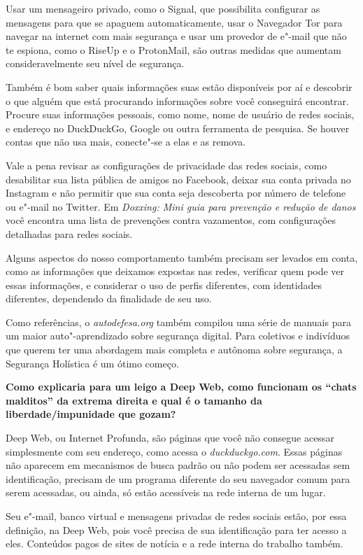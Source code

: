 Usar um mensageiro privado, como o
Signal, que possibilita configurar as
mensagens para que se apaguem automaticamente, usar o
Navegador Tor para navegar na
internet com mais segurança e usar um provedor de e"-mail que não te
espiona, como o RiseUp e o
ProtonMail, são outras
medidas que aumentam consideravelmente seu nível de segurança.

Também é bom saber quais informações suas estão disponíveis por aí e
descobrir o que alguém que está procurando informações sobre você
conseguirá encontrar. Procure suas informações pessoais, como nome, nome
de usuário de redes sociais,  e endereço no DuckDuckGo, Google ou
outra ferramenta de pesquisa. Se houver contas que não usa mais,
conecte"-se a elas e as remova.

Vale a pena revisar as configurações de privacidade das redes sociais,
como desabilitar sua lista pública de amigos no Facebook, deixar sua
conta privada no Instagram e não permitir que sua conta seja descoberta
por número de telefone ou e"-mail no Twitter. Em
\emph{Doxxing:
Mini guia para prevenção e redução de danos} você encontra uma
lista de prevenções contra vazamentos, com configurações detalhadas para
redes sociais.

Alguns aspectos do nosso comportamento também precisam ser levados em
conta, como as informações que deixamos expostas nas redes, verificar quem
pode ver essas informações, e considerar o uso de perfis diferentes, com
identidades diferentes, dependendo da finalidade de seu uso.

Como referências, o \emph{autodefesa.org} também compilou uma série de manuais para um maior auto"-aprendizado
sobre segurança digital. Para coletivos e indivíduos que querem ter uma
abordagem mais completa e autônoma sobre segurança, a
Segurança Holística é um ótimo começo.

\bigskip

\noindent{}\textbf{Como explicaria para um leigo a Deep Web, como funcionam os
``chats malditos'' da extrema direita e qual é o tamanho da
liberdade/impunidade que gozam?}

Deep Web, ou Internet Profunda, são páginas que
você não consegue acessar simplesmente com seu endereço, como acessa o
\emph{duckduckgo.com}. Essas páginas não aparecem em mecanismos de busca padrão
ou não podem ser acessadas sem identificação, precisam de um programa
diferente do seu navegador comum para serem acessadas, ou ainda, só
estão acessíveis na rede interna de um lugar.

Seu e"-mail, banco virtual e mensagens privadas de redes sociais estão,
por essa definição, na Deep Web, pois você precisa de sua identificação
para ter acesso a eles. Conteúdos pagos de sites de notícia e a rede
interna do trabalho também.

